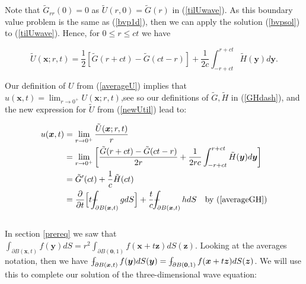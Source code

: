 \documentclass[a4paper, 12pt]{article}
\def\Xint#1{\mathchoice
{\XXint\displaystyle\textstyle{#1}}%
{\XXint\textstyle\scriptstyle{#1}}%
{\XXint\scriptstyle\scriptscriptstyle{#1}}%
{\XXint\scriptscriptstyle\scriptscriptstyle{#1}}%
\!\int}
\def\XXint#1#2#3{{\setbox0=\hbox{$#1{#2#3}{\int}$ }
\vcenter{\hbox{$#2#3$ }}\kern-.6\wd0}}
\def\dashint{\Xint-}
\numberwithin{equation}{section}
\begin{document}
Note that $\tilde{G}_{rr}(0)=0$ as $\tilde{U}(r,0)=\tilde{G}(r)$ in
(\ref{tilUwave}). As this boundary value problem is the same as (\ref{bvp1d}),
then we can apply the solution (\ref{bvpsol}) to (\ref{tilUwave}). Hence, for $0
\le r \le ct$ we have 

\begin{equation} \label{newUtil}
    \tilde{U}(\boldsymbol{x};r,t)=\frac{1}{2}\left[\tilde{G}(r+ct)-\tilde{G}(ct-r)\right]+\frac{1}{2c}\int^{r+ct}_{-r+ct}\tilde{H}(\boldsymbol{y})d\boldsymbol{y}.
\end{equation} 

Our definition of $U$ from (\ref{averageU}) implies that
 $u(\boldsymbol{x},t)=\lim_{r\rightarrow 0^+}U(\boldsymbol{x};r,t)$,see
 \cite[Ch. 2.4.1.c]{Ev} so our
 definitions of $\tilde{G}, \tilde{H}$ in (\ref{GHdash}), and the new expression
 for $\tilde{U}$ from (\ref{newUtil}) lead to:

\begin{equation} \label{almostK}
    \begin{aligned}
        u(\boldsymbol{x},t)&=\lim_{r\rightarrow 0^+}\frac{\tilde{U}(\boldsymbol{x};r,t)}{r}\\
        &=\lim_{r\rightarrow 0^+}\left[\frac{\tilde{G}(r+ct)-\tilde{G}(ct-r)}{2r}+\frac{1}{2rc}\int^{r+ct}_{-r+ct}\tilde{H}(\boldsymbol{y})d\boldsymbol{y}\right]\\
        &=\tilde{G}'(ct)+\frac{1}{c}\tilde{H}(ct)\\
        &=\diffp[1]{}{t}\Big[t\dashint_{\partial B(\boldsymbol{x},t)}{gdS} \Big]+\frac{t}{c}\dashint_{\partial B(\boldsymbol{x},t)}{hdS} \quad \textrm{by (\ref{averageGH})}
    \end{aligned}
\end{equation}
\\

In section \ref{prereq} we saw that $\int_{\partial
B(\boldsymbol{x},t)}f(\boldsymbol{y})dS=r^2\int_{\partial B(\boldsymbol{0},1)}
f(\boldsymbol{x}+t\boldsymbol{z})dS(\boldsymbol{z})$. Looking at the averages
notation, then we have $\dashint_{\partial B(\boldsymbol{x}, t)}
f(\boldsymbol{y})dS(\boldsymbol{y}) = \dashint_{\partial B(\boldsymbol{0}, 1)}
f(\boldsymbol{x}+t\boldsymbol{z})dS(\boldsymbol{z})$. We will use this to
complete our solution of the three-dimensional wave equation:
\end{document}
